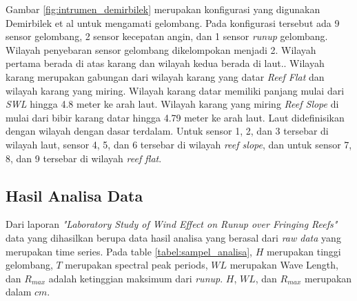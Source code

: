   Gambar \ref{fig:intrumen_demirbilek} merupakan konfigurasi yang digunakan Demirbilek et al \cite{DemirbilekReport} untuk mengamati gelombang. Pada konfigurasi tersebut ada 9 sensor gelombang, 2 sensor kecepatan angin, dan 1 sensor \emph{runup} gelombang. Wilayah penyebaran sensor gelombang dikelompokan menjadi 2. Wilayah pertama berada di atas karang dan wilayah kedua berada di laut.. Wilayah karang merupakan gabungan dari wilayah karang yang datar \emph{Reef Flat} dan wilayah karang yang miring. Wilayah karang datar memiliki panjang mulai dari \emph{SWL} hingga 4.8 meter ke arah laut. Wilayah karang yang miring \emph{Reef Slope} di mulai dari bibir karang datar hingga 4.79 meter ke arah laut. Laut didefinisikan dengan wilayah dengan dasar terdalam. Untuk sensor 1, 2, dan 3 tersebar di wilayah laut, sensor 4, 5, dan 6 tersebar di wilayah \emph{reef slope}, dan untuk sensor 7, 8, dan 9 tersebar di wilayah \emph{reef flat}.

\pagebreak

\subsection{Hasil Analisa Data}
  Dari laporan \emph{"Laboratory Study of Wind Effect on Runup over Fringing Reefs"} \cite{DemirbilekReport} data yang dihasilkan berupa data hasil analisa yang berasal dari \emph{raw data} yang merupakan time series. Pada table \ref{tabel:sampel_analisa}, $H$ merupakan tinggi gelombang, $T$ merupakan spectral peak periods, $WL$ merupakan Wave Length, dan $R_{max}$ adalah ketinggian maksimum dari \emph{runup}. $H$, $WL$, dan $R_{max}$ merupakan dalam $cm$.

